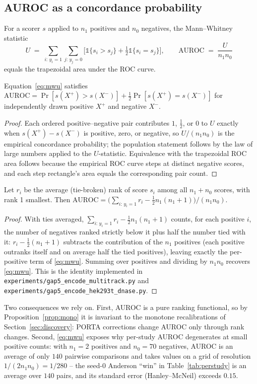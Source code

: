 \subsection{AUROC as a concordance probability}
For a scorer $s$ applied to $n_1$ positives and $n_0$ negatives, the
Mann--Whitney statistic
\begin{equation}
U \;=\; \sum_{i:\,y_i=1}\sum_{j:\,y_j=0}
\Big[\mathbb{1}\{s_i > s_j\} + \tfrac{1}{2}\mathbb{1}\{s_i = s_j\}\Big],
\qquad
\mathrm{AUROC} \;=\; \frac{U}{n_1 n_0}
\label{eq:mwu}
\end{equation}
equals the trapezoidal area under the ROC curve.
\begin{proposition}
\label{prop:auroc}
Equation~\eqref{eq:mwu} satisfies
$\mathrm{AUROC} = \Pr[s(X^+) > s(X^-)] + \tfrac12 \Pr[s(X^+) = s(X^-)]$
for independently drawn positive $X^+$ and negative $X^-$.
\end{proposition}
\begin{proof}
Each ordered positive--negative pair contributes $1$, $\tfrac12$, or $0$
to $U$ exactly when $s(X^+) - s(X^-)$ is positive, zero, or negative, so
$U/(n_1 n_0)$ is the empirical concordance probability; the population
statement follows by the law of large numbers applied to the
$U$-statistic. Equivalence with the trapezoidal ROC area follows because
the empirical ROC curve steps at distinct negative scores, and each step
rectangle's area equals the corresponding pair count.
\end{proof}
\begin{corollary}
\label{cor:midrank}
Let $r_i$ be the average (tie-broken) rank of score $s_i$ among all
$n_1+n_0$ scores, with rank 1 smallest. Then
$\mathrm{AUROC} = \big(\sum_{i:\,y_i=1} r_i - \tfrac12 n_1(n_1+1)\big)/(n_1 n_0)$.
\end{corollary}
\begin{proof}
With ties averaged, $\sum_{i:\,y_i=1} r_i - \tfrac12 n_1(n_1+1)$ counts,
for each positive $i$, the number of negatives ranked strictly below it
plus half the number tied with it: $r_i - \tfrac12(n_1+1)$ subtracts the
contribution of the $n_1$ positives (each positive outranks itself and on
average half the tied positives), leaving exactly the per-positive term of
\eqref{eq:mwu}. Summing over positives and dividing by $n_1 n_0$ recovers
\eqref{eq:mwu}. This is the identity implemented in
\texttt{experiments/gap5\_encode\_multitrack.py} and
\texttt{experiments/gap5\_encode\_hek293t\_dnase.py}.
\end{proof}
Two consequences we rely on. First, AUROC is a pure ranking functional,
so by Proposition~\ref{prop:mono} it is invariant to the monotone
recalibrations of Section~\ref{sec:discovery}: PORTA corrections change
AUROC only through rank changes. Second, \eqref{eq:mwu} exposes why
per-study AUROC degenerates at small positive counts: with $n_1 = 2$
positives and $n_0 = 70$ negatives, AUROC is an average of only $140$
pairwise comparisons and takes values on a grid of resolution
$1/(2 n_1 n_0) = 1/280$ -- the seed-0 Anderson ``win'' in
Table~\ref{tab:perstudy} is an average over $140$ pairs, and its
standard error (Hanley--McNeil) exceeds $0.15$.

